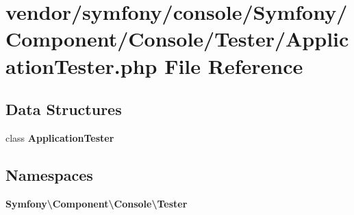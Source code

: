 \section{vendor/symfony/console/\+Symfony/\+Component/\+Console/\+Tester/\+Application\+Tester.php File Reference}
\label{_application_tester_8php}
\subsection*{Data Structures}
\begin{DoxyCompactItemize}
\item 
class {\bf Application\+Tester}
\end{DoxyCompactItemize}
\subsection*{Namespaces}
\begin{DoxyCompactItemize}
\item 
 {\bf Symfony\textbackslash{}\+Component\textbackslash{}\+Console\textbackslash{}\+Tester}
\end{DoxyCompactItemize}
